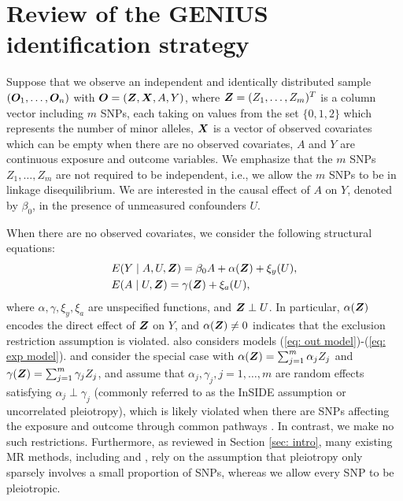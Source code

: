 \documentclass[12pt]{article}
\begin{document}
\section{Review of the GENIUS identification strategy} 
\label{sec: prelim}
Suppose that we observe an independent and identically distributed sample $ (\bm O_1, \dots, \bm O_n) $ with $ \bm O= ( \bm{Z}, \bm{X}, A, Y) $, where $\bm{Z}=(Z_1, \dots, Z_m)^T$ is a column vector including $m$ SNPs, each taking on values from the set $\{0,1,2\}$  which represents the number of minor alleles,  $ \bm{X} $ is a vector of observed covariates which can be empty when there are no observed covariates, $A$ and $ Y $ are continuous exposure and outcome variables. We emphasize that the $ m $ SNPs $ Z_1, \dots, Z_m $ are not required to be independent, i.e., we allow the $ m $ SNPs to be in linkage disequilibrium. We are interested in the causal effect of $ A $ on $ Y $, denoted by $ \beta_0 $, in the presence of unmeasured confounders $ U $. 


When there are no observed covariates, we consider the following structural equations:
\begin{align}
	& E(Y\mid A,  U, \bm{Z})=\beta_0A+ \alpha(\bm{Z}) +\xi_y(U), \label{eq: out model}\\
	& E(A\mid  U, \bm{Z})= \gamma(\bm{Z})+ \xi_a(U), \label{eq: exp model}
\end{align}
where $\alpha, \gamma,  \xi_y, \xi_a$ are unspecified functions, and $ \bm{Z}\perp U  $. In particular, $ \alpha(\bm{Z}) $ encodes the direct effect of $ \bm{Z} $ on $ Y $, and $\alpha(\bm{Z})\neq 0 $ indicates that the exclusion restriction assumption is violated.  \cite{Lewbel:2012aa} also considers models (\ref{eq: out model})-(\ref{eq: exp model}).  \cite{Kolesar:2015aa} and \cite{Bowden:2015aa} consider the special case with $ \alpha(\bm{Z})=\sum_{j=1}^{m} \alpha_j Z_j $ and $ \gamma(\bm{Z})= \sum_{j=1}^{m} \gamma_j Z_j $, and assume that $ \alpha_j, \gamma_j, j=1, \dots, m $ are  random effects satisfying $ \alpha_j\perp \gamma_j $ (commonly referred to as the InSIDE assumption or uncorrelated pleiotropy), which is likely violated when there are SNPs affecting the exposure and outcome through common pathways \citep{morrison2020ng}. In contrast, we make no such restrictions.  Furthermore, as reviewed in Section \ref{sec: intro}, many existing MR methods, including \cite{Kang:2016aa, Bowden:2016aa, Hartwig:2017aa, Guo:2018aa, Windmeijer:2019aa} and \cite{guo2021post},  rely on the assumption that pleiotropy only sparsely involves  a small proportion of SNPs, whereas we allow every SNP to be pleiotropic. 
\end{document}
